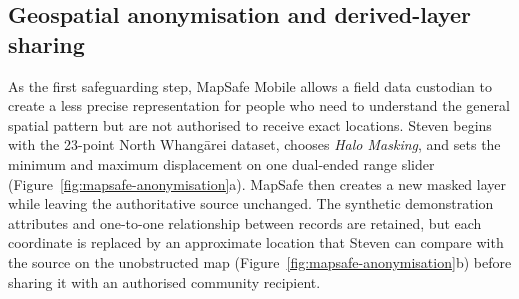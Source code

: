 \documentclass[a4paper,UKenglish,cleveref,autoref,thm-restate]{lipics-v2021}
\begin{document}
\FloatBarrier
\subsection{Geospatial anonymisation and derived-layer sharing}
\label{sec:anonymisation}



As the first safeguarding step, MapSafe Mobile allows a field data custodian to create a less precise representation for people who need to understand the general spatial pattern but are not authorised to receive exact locations. Steven begins with the 23-point North Whangārei dataset, chooses \emph{Halo Masking}, and sets the minimum and maximum displacement on one dual-ended range slider (Figure~\ref{fig:mapsafe-anonymisation}a). MapSafe then creates a new masked layer while leaving the authoritative source unchanged. The synthetic demonstration attributes and one-to-one relationship between records are retained, but each coordinate is replaced by an approximate location that Steven can compare with the source on the unobstructed map (Figure~\ref{fig:mapsafe-anonymisation}b) before sharing it with an authorised community recipient.
\end{document}
